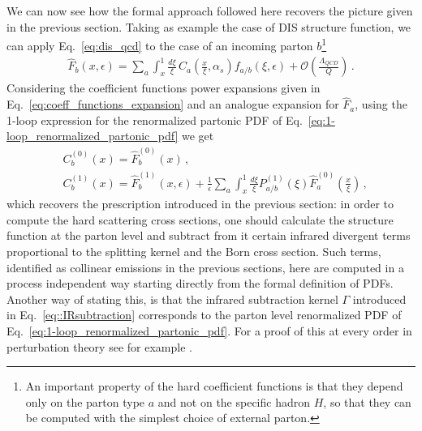 %
We can now see how the formal approach followed here recovers the picture given in the previous section.
Taking as example the case of DIS structure function, we can apply Eq.~\eqref{eq:dis_qcd} to the case of an 
incoming parton $b$\footnote{An important property of the hard coefficient functions is that they 
depend only on the parton type $a$ and not on the specific hadron $H$, 
so that they can be computed with the simplest choice of external parton.}
\begin{align}
    \label{eq:partonic_structure_function}
    \hat{F}_{b}\left(x,\epsilon\right) = 
    \sum_a \int_x^1\frac{d\xi}{\xi}\,C_a\left(\frac{x}{\xi}, \alpha_s\right)f_{a/b}\left(\xi,\epsilon\right)
    +\mathcal{O}\left(\frac{\Lambda_{QCD}}{Q}\right)\,.
\end{align}
Considering the coefficient functions power expansions given in Eq.~\eqref{eq:coeff_functions_expansion}
and an analogue expansion for $\hat{F}_{a}$, using the 1-loop expression for the
renormalized partonic PDF of Eq.~\eqref{eq:1-loop_renormalized_partonic_pdf} we get
\begin{align}
    \label{eq:IR_subtraction_from_formal_definition}
    &C^{(0)}_b\left(x\right) = \hat{F}_b^{(0)}\left(x\right)\,,\\
    &C^{(1)}_b\left(x\right) = \hat{F}_b^{(1)}\left(x,\epsilon\right) + \frac{1}{\epsilon}\sum_a\int_x^1 \frac{d\xi}{\xi}P_{a/b}^{(1)}\left(\xi\right)
    \hat{F}_a^{(0)}\left(\frac{x}{\xi}\right)\,,
\end{align}
which recovers the prescription introduced in the previous section: in order to compute
the hard scattering cross sections, one should calculate the structure function at the parton level and subtract
from it certain infrared divergent terms proportional to the splitting kernel and the Born cross section.
Such terms, identified as collinear emissions in the previous sections, here are computed in a process independent
way starting directly from the formal definition of PDFs.
Another way of stating this, is that the infrared subtraction kernel $\Gamma$ introduced in Eq.~\eqref{eq::IRsubtraction}
corresponds to the parton level renormalized PDF of Eq.~\eqref{eq:1-loop_renormalized_partonic_pdf}. For a proof
of this at every order in perturbation theory see for example \cite{Collins:1980ui}.


